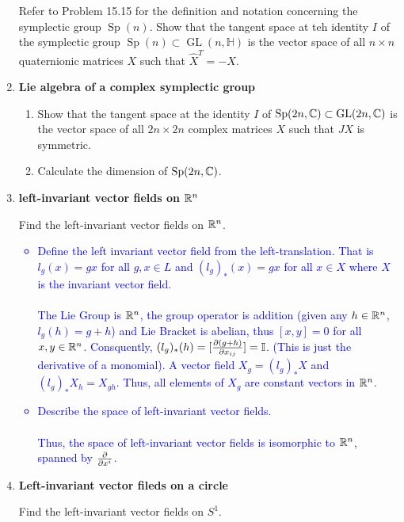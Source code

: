 \documentclass[12pt,a4paper]{report}
\newcommand{\SP}{\operatorname{Sp}}
\newcommand{\GL}{\operatorname{GL}}
\newcommand{\BLUE}[1]{\textcolor{blue}{#1}}
\begin{document}
\begin{enumerate}[label=\textbf{16.\arabic*.}]
	Refer to Problem 15.15 for the definition and notation concerning the symplectic group $\SP(n)$.  Show that the tangent space at teh identity $I$ of the symplectic group $\SP(n) \subset \GL(n,\mathbb{H})$ is the vector space of all $n \times n$  quaternionic matrices $X$ such that $\hat{X}^T=-X$.
	
	\item \textbf{Lie algebra of a complex symplectic group}
	
	\begin{enumerate}[label=(\alph*)]
	
		\item Show that the tangent space at the identity $I$ of $\SP(2n,\C) \subset \GL(2n,\C)$ is the vector space of all $2n \times 2n$ complex matrices $X$ such that $JX$ is symmetric.
		
		\item Calculate the dimension of $\SP(2n,\C)$.
	
	\end{enumerate}
	
	\item \textbf{left-invariant vector fields on $\mathbb{R}^n$}
	
	Find the left-invariant vector fields on $\mathbb{R}^n$.
	\BLUE{\begin{itemize}
		\item Define the left invariant vector field from the left-translation.  That is $l_g(x)=gx$ for all $g,x \in L$ and $(l_g)_*(x) = gx$ for all $x \in X$ where $X$ is the invariant vector field.\\
		\\
		The Lie Group is $\mathbb{R}^n$, the group operator is addition (given any $h \in \mathbb{R}^n$, $l_g(h)=g+h$) and Lie Bracket is abelian, thus $[x,y] = 0$ for all $x,y \in \mathbb{R}^n$.   Consquently, $(l_g)_*(h) = [\frac{\partial (g+h)}{\partial x_{ij}}]=\mathbb{I}$.  (This is just the derivative of a monomial). A vector field $X_g = (l_g)_*X$ and $(l_g)_*X_h = X_{gh}$.  Thus, all elements of $X_g$ are constant vectors in $\mathbb{R}^n$.
		\item Describe the space of left-invariant vector fields.\\
		\\
		Thus, the space of left-invariant vector fields is isomorphic to $\mathbb{R}^n$, spanned by $\frac{\partial }{\partial x^i}$.
\end{itemize}	
	}
	
	\item \textbf{Left-invariant vector fileds on a circle}
	
	Find the left-invariant vector fields on $S^1$.
	

\end{enumerate}
\end{document}
